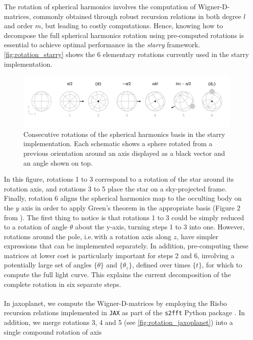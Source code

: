 \documentclass[modern]{aastex631}
\begin{document}
The rotation of spherical harmonics involves the computation of Wigner-D-matrices, commonly obtained through robust recursion relations in both degree $l$ and order $m$, but leading to costly computations. Hence, knowing how to decompose the full spherical harmonics rotation using pre-computed rotations is essential to achieve optimal performance in the \textit{starry} framework. \autoref{fig:rotation_starry} shows the 6 elementary rotations currently used in the \textsf{starry} implementation.
\begin{figure}[H]
    \begin{center}
        \includegraphics[width=\textwidth]{../workflows/rotations/figures/rotation_starry.pdf}
        \caption{Consecutive rotations of the spherical harmonics basis in the \textsf{starry} implementation. Each schematic shows a sphere rotated from a previous orientation around an axis displayed as a black vector and an angle shown on top.}
        \label{fig:rotation_starry}
    \end{center}
\end{figure}
In this figure, rotations 1 to 3 correspond to a rotation of the star around its rotation axis, and rotations 3 to 5 place the star on a sky-projected frame. Finally, rotation 6 aligns the spherical harmonics map to the occulting body on the $y$ axis in order to apply Green's theorem in the appropriate basis (Figure 2 from \citealt{starry}). The first thing to notice is that rotations 1 to 3 could be simply reduced to a rotation of angle $\theta$ about the y-axis, turning steps 1 to 3 into one. However, rotations around the pole, i.e.\,with a rotation axis along $z$, have simpler expressions that can be implemented separately. In addition, pre-computing these matrices at lower cost is particularly important for steps 2 and 6, involving a potentially large set of angles $\{\theta\}$ and $\{\theta_z\}$, defined over times $\{t\}$, for which to compute the full light curve. This explains the current decomposition of the complete rotation in six separate steps.\\\\
In \textsf{jaxoplanet}, we compute the Wigner-D-matrices by employing the Risbo recursion relations \citep{Risbo1996} implemented in \texttt{JAX} as part of the \texttt{s2fft} Python package \citep{price:s2fft}. In addition, we merge rotations 3, 4 and 5 (see \autoref{fig:rotation_jaxoplanet}) into a single compound rotation of axis
\end{document}
